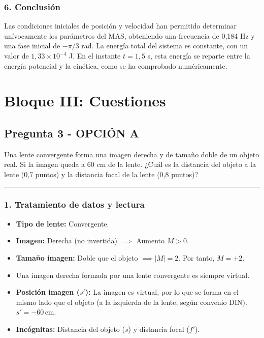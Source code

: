\subsubsection*{6. Conclusión}
\begin{cajaconclusion}
Las condiciones iniciales de posición y velocidad han permitido determinar unívocamente los parámetros del MAS, obteniendo una frecuencia de 0,184 Hz y una fase inicial de $-\pi/3$ rad. La energía total del sistema es constante, con un valor de $1,33 \times 10^{-4}$ J. En el instante $t=1,5$ s, esta energía se reparte entre la energía potencial y la cinética, como se ha comprobado numéricamente.
\end{cajaconclusion}

\newpage

\section{Bloque III: Cuestiones}
\label{sec:optica_2007_sep_ext}

\subsection{Pregunta 3 - OPCIÓN A}
\label{subsec:3A_2007_sep_ext}

\begin{cajaenunciado}
Una lente convergente forma una imagen derecha y de tamaño doble de un objeto real. Si la imagen queda a 60 cm de la lente. ¿Cuál es la distancia del objeto a la lente (0,7 puntos) y la distancia focal de la lente (0,8 puntos)?
\end{cajaenunciado}
\hrule

\subsubsection*{1. Tratamiento de datos y lectura}
\begin{itemize}
    \item \textbf{Tipo de lente:} Convergente.
    \item \textbf{Imagen:} Derecha (no invertida) $\implies$ Aumento $M>0$.
    \item \textbf{Tamaño imagen:} Doble que el objeto $\implies |M|=2$. Por tanto, $M=+2$.
    \item Una imagen derecha formada por una lente convergente es siempre virtual.
    \item \textbf{Posición imagen ($s'$):} La imagen es virtual, por lo que se forma en el mismo lado que el objeto (a la izquierda de la lente, según convenio DIN). $s' = -60\,\text{cm}$.
    \item \textbf{Incógnitas:} Distancia del objeto ($s$) y distancia focal ($f'$).
\end{itemize}

